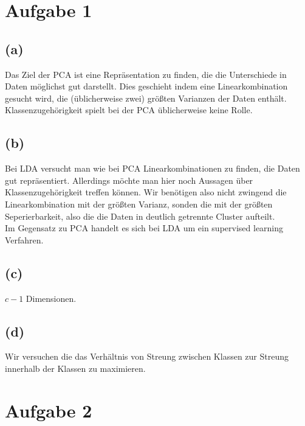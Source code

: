 \documentclass[a4paper]{scrartcl}
\begin{document}
\section*{Aufgabe 1}
\subsection*{(a)}
Das Ziel der PCA ist eine Repräsentation zu finden, die die Unterschiede in Daten möglichst gut darstellt. Dies geschieht indem eine Linearkombination gesucht wird, die (üblicherweise zwei) größten Varianzen der Daten enthält.\\
Klassenzugehörigkeit spielt bei der PCA üblicherweise keine Rolle. %



\subsection*{(b)}
Bei LDA versucht man wie bei PCA Linearkombinationen zu finden, die Daten gut repräsentiert. Allerdings möchte man hier noch Aussagen über Klassenzugehörigkeit treffen können. Wir benötigen also nicht zwingend die Linearkombination mit der größten Varianz, sonden die mit der größten Seperierbarkeit, also die die Daten in deutlich getrennte Cluster aufteilt.\\
Im Gegensatz zu PCA handelt es sich bei LDA um ein supervised learning Verfahren.



\subsection*{(c)}
$c-1$ Dimensionen.





\subsection*{(d)}
Wir versuchen die das Verhältnis von Streung zwischen Klassen zur Streung innerhalb der Klassen zu maximieren.


\section*{Aufgabe 2}
\end{document}
